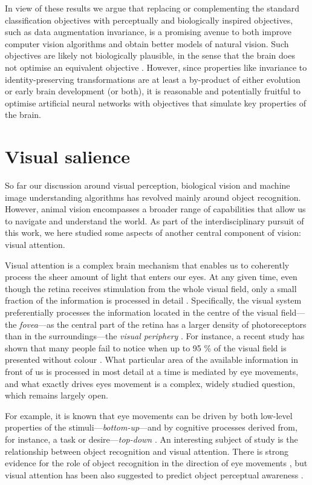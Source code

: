 {In view of these results we argue that replacing or complementing the standard classification objectives with perceptually and biologically inspired objectives, such as data augmentation invariance, is a promising avenue to both improve computer vision algorithms and obtain better models of natural vision. Such objectives are likely not biologically plausible, in the sense that the brain does not optimise an equivalent objective \citep{pozzi2018biologicallyplausible}. However, since properties like invariance to identity-preserving transformations are at least a by-product of either evolution or early brain development (or both), it is reasonable and potentially fruitful to optimise artificial neural networks with objectives that simulate key properties of the brain.

\section{Visual salience}
So far our discussion around visual perception, biological vision and machine image understanding algorithms has revolved mainly around object recognition. However, animal vision encompasses a broader range of capabilities that allow us to navigate and understand the world. As part of the interdisciplinary pursuit of this work, we here studied some aspects of another central component of vision: visual attention.

Visual attention is a complex brain mechanism that enables us to coherently process the sheer amount of light that enters our eyes. At any given time, even though the retina receives stimulation from the whole visual field, only a small fraction of the information is processed in detail \citep{desimone1995visualattention}. Specifically, the visual system preferentially processes the information located in the centre of the visual field---the \textit{fovea}---as the central part of the retina has a larger density of photoreceptors than in the surroundings---the \textit{visual periphery} \citep{wassle1990fovea, azzopardi1993fovea}. For instance, a recent study has shown that many people fail to notice when up to 95 \% of the visual field is presented without colour \citep{cohen2020colour}. What particular area of the available information in front of us is processed in most detail at a time is mediated by eye movements, and what exactly drives eyes movement is a complex, widely studied question, which remains largely open.

For example, it is known that eye movements can be driven by both low-level properties of the stimuli---\textit{bottom-up}---and by cognitive processes derived from, for instance, a task or desire---\textit{top-down} \citep{vonstein2000topdown, munoz2004bottomup, connor2004buttomuptopdown, betz2010topdown, kollmorgen2010topdownbottomup, schutt2019bottomuptopdown}. An interesting subject of study is the relationship between object recognition and visual attention. There is strong evidence for the role of object recognition in the direction of eye movements \citep{zhaoping2007topdown}, but visual attention has been also suggested to predict object perceptual awareness \citep{holm2008attentionprecedes, kietzmann2011attentionprecedes}. 

}
